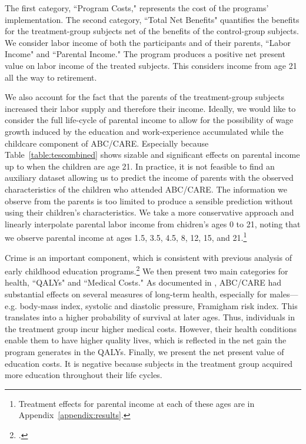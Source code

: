The first category, ``Program Costs," represents the cost of the programs' implementation. The second category, ``Total Net Benefits" quantifies the benefits for the treatment-group subjects net of the benefits of the control-group subjects. We consider labor income of both the participants and of their parents, ``Labor Income" and ``Parental Income." The program produces a positive net present value on labor income of the treated subjects. This considers income from age 21 all the way to retirement.

We also account for the fact that the parents of the treatment-group subjects increased their labor supply and therefore their income. Ideally, we would like to consider the full life-cycle of parental income to allow for the possibility of wage growth induced by the education and work-experience accumulated while the childcare component of ABC/CARE. Especially because Table~\ref{table:tescombined} shows sizable and significant effects on parental income up to when the children are age 21. In practice, it is not feasible to find an auxiliary dataset allowing us to predict the income of parents with the observed characteristics of the children who attended ABC/CARE. The information we observe from the parents is too limited to produce a sensible prediction without using their children's characteristics. We take a more conservative approach and linearly interpolate parental labor income from chidren's ages 0 to 21, noting that we observe parental income at ages 1.5, 3.5, 4.5, 8, 12, 15, and 21.\footnote{Treatment effects for parental income at each of these ages are in Appendix~\ref{appendix:results}.}

Crime is an important component, which is consistent with previous analysis of early childhood education programs.\footnote{\citet{Heckman_Moon_etal_2010_RateofReturn}.} We then present two main categories for health, ``QALYs" and ``Medical Costs." As documented in \citet{Campbell_Conti_etal_2014_EarlyChildhoodInvestments}, ABC/CARE had substantial effects on several measures of long-term health, especially for males---e.g. body-mass index, systolic and diastolic pressure, Framigham risk index. This translates into a higher probability of survival at later ages. Thus, individuals in the treatment group incur higher medical costs. However, their health conditions enable them to have higher quality lives, which is reflected in the net gain the program generates in the QALYs. Finally, we present the net present value of education costs. It is negative because subjects in the treatment group acquired more education throughout their life cycles.

